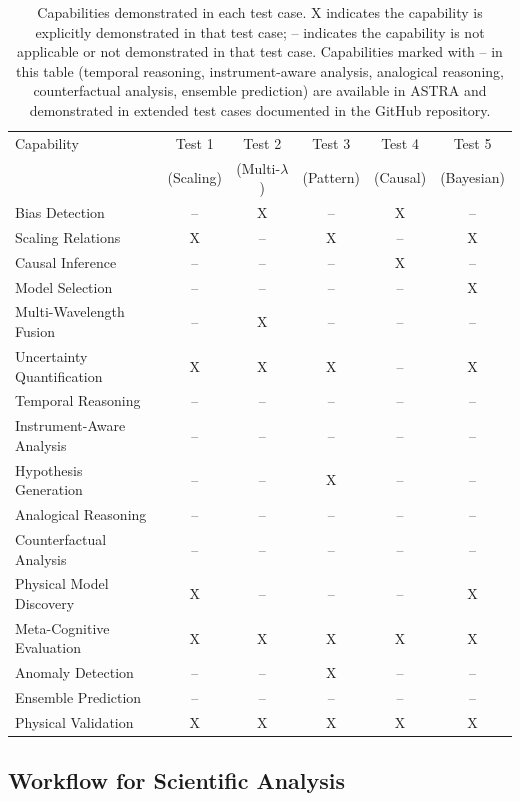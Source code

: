 \documentclass[usenatbib]{rasti}
\begin{document}
\begin{table}
\centering
\begin{tabular}{lccccc}
\hline
Capability & Test 1 & Test 2 & Test 3 & Test 4 & Test 5 \\
& (Scaling) & (Multi-$\lambda$) & (Pattern) & (Causal) & (Bayesian) \\
\hline
Bias Detection & -- & X & -- & X & -- \\
Scaling Relations & X & -- & X & -- & X \\
Causal Inference & -- & -- & -- & X & -- \\
Model Selection & -- & -- & -- & -- & X \\
Multi-Wavelength Fusion & -- & X & -- & -- & -- \\
Uncertainty Quantification & X & X & X & -- & X \\
Temporal Reasoning & -- & -- & -- & -- & -- \\
Instrument-Aware Analysis & -- & -- & -- & -- & -- \\
Hypothesis Generation & -- & -- & X & -- & -- \\
Analogical Reasoning & -- & -- & -- & -- & -- \\
Counterfactual Analysis & -- & -- & -- & -- & -- \\
Physical Model Discovery & X & -- & -- & -- & X \\
Meta-Cognitive Evaluation & X & X & X & X & X \\
Anomaly Detection & -- & -- & X & -- & -- \\
Ensemble Prediction & -- & -- & -- & -- & -- \\
Physical Validation & X & X & X & X & X \\
\hline
\end{tabular}
\caption{Capabilities demonstrated in each test case. X indicates the capability is explicitly demonstrated in that test case; -- indicates the capability is not applicable or not demonstrated in that test case. Capabilities marked with -- in this table (temporal reasoning, instrument-aware analysis, analogical reasoning, counterfactual analysis, ensemble prediction) are available in ASTRA and demonstrated in extended test cases documented in the GitHub repository.}
\label{tab:capabilities}
\end{table}

\subsection{Workflow for Scientific Analysis}
\end{document}
